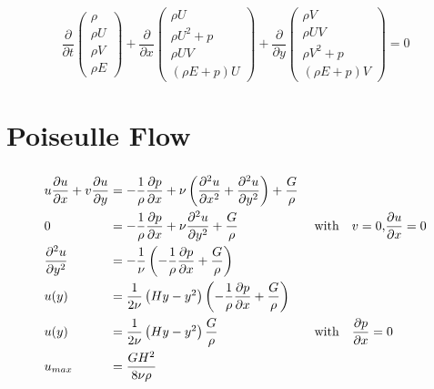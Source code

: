 \documentclass[
	pdftex,             %
	12pt,				%
	a4paper,		   	%
	english,				%
	oneside,			%
]{article}
\begin{document}
\begin{equation}
\dfrac{\partial}{\partial t}
\begin{pmatrix}
\rho \\ \rho U \\ \rho V \\ \rho E
\end{pmatrix}
+
\dfrac{\partial}{\partial x}
\begin{pmatrix}
\rho U \\ \rho U^2 + p \\ \rho U V \\ (\rho E + p)U
\end{pmatrix}
+
\dfrac{\partial}{\partial y}
\begin{pmatrix}
\rho V \\ \rho U V \\ \rho V^2 + p \\ (\rho E + p)V
\end{pmatrix}
=0
\end{equation}

\clearpage

\section{Poiseulle Flow}

\begin{eqnarray}
\begin{split}
\arraycolsep=1.4pt\def\arraystretch{2.2}
\begin{array}{lcll}
u\dfrac{\partial u}{\partial x} + v\dfrac{\partial u}{\partial y}
&=& 
-\dfrac{1}{\rho} \dfrac{\partial p}{\partial x}
+ \nu \left( \dfrac{\partial^2 u}{\partial x^2} + \dfrac{\partial^2 u}{\partial y^2} \right)
+ \dfrac{G}{\rho}&
\\
0 &=& -\dfrac{1}{\rho} \dfrac{\partial p}{\partial x} + \nu \dfrac{\partial^2 u}{\partial y^2} + \dfrac{G}{\rho}
&\textnormal{~~~with~~~} v = 0 \textnormal{,} \dfrac{\partial u}{\partial x} = 0
\\
\dfrac{\partial^2 u}{\partial y^2} 
&=&
-\dfrac{1}{\nu} \left( -\dfrac{1}{\rho} \dfrac{\partial p}{\partial x} + \dfrac{G}{\rho}\right)&
\\
u(y) &=& \dfrac{1}{2\nu} \left( Hy - y^2 \right) 
         \left( -\dfrac{1}{\rho} \dfrac{\partial p}{\partial x} + \dfrac{G}{\rho} \right)&
\\
u(y) &=& \dfrac{1}{2\nu} \left( Hy - y^2 \right) \dfrac{G}{\rho}
&\textnormal{~~~with~~~}
\dfrac{\partial p}{\partial x} = 0
\\
u_{max} &=& \dfrac{GH^2}{8\nu\rho}&
\end{array}
\end{split}
\end{eqnarray}
\end{document}
